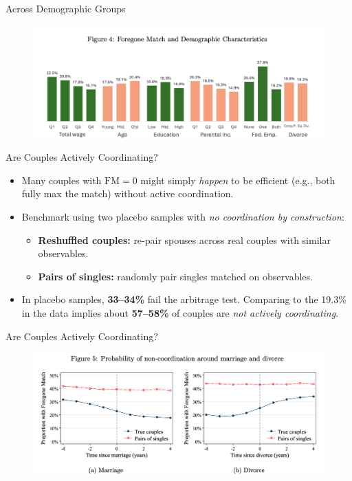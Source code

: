 \documentclass[11pt,notes=hide,aspectratio=169,mathserif]{beamer}
\begin{document}
\begin{frame}{Across Demographic Groups}
\small
\begin{figure}
\centering
\includegraphics[width=0.9\linewidth]{inputs/fig4.png}
\end{figure}
\end{frame}

\begin{frame}{Are Couples Actively Coordinating?}
\small
\begin{itemize}
  \item Many couples with $\mathrm{FM}=0$ might simply \emph{happen} to be efficient (e.g., both fully max the match) without active coordination.
  \item Benchmark using two placebo samples with \emph{no coordination by construction}:
  \begin{itemize}
    \item \textbf{Reshuffled couples:} re-pair spouses across real couples with similar observables.
    \item \textbf{Pairs of singles:} randomly pair singles matched on observables.
  \end{itemize}
  \item In placebo samples, \textbf{33--34\%} fail the arbitrage test. Comparing to the 19.3\% in the data implies about \textbf{57--58\%} of couples are \emph{not actively coordinating}.
\end{itemize}
\end{frame}

\begin{frame}{Are Couples Actively Coordinating?}
\small
\begin{figure}
\centering
\includegraphics[width=0.9\linewidth]{inputs/fig5.png}
\end{figure}
\end{frame}
\end{document}
